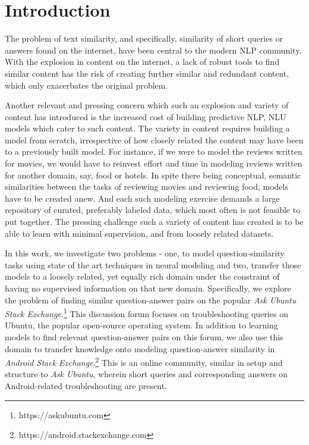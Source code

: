 \documentclass{sigkddExp}
\begin{document}
\section{Introduction}
The problem of text similarity, and specifically, similarity of short queries or answers found on the internet, have been central to the modern NLP community. With the explosion in content on the internet, a lack of robust tools to find similar content has the risk of creating further similar and redundant content, which only exacerbates the original problem.

Another relevant and pressing concern which such an explosion and variety of content has introduced is the increased cost of building predictive NLP, NLU models which cater to such content. The variety in content requires building a model from scratch, irrespective of how closely related the content may have been to a previously built model. For instance, if we were to model the reviews written for movies, we would have to reinvest effort and time in modeling reviews written for another domain, say, food or hotels. In spite there being conceptual, semantic similarities between the tasks of reviewing movies and reviewing food, models have to be created anew. And each such modeling exercise demands a large repository of curated, preferably labeled data, which most often is not feasible to put together. The pressing challenge such a variety of content has created is to be able to learn with minimal supervision, and from loosely related datasets.

In this work, we investigate two problems - one, to model question-similarity tasks using state of the art techniques in neural modeling and two, transfer those models to a loosely related, yet equally rich domain under the constraint of having no supervised information on that new domain. Specifically, we explore the problem of finding similar question-answer pairs on the popular \textit{Ask Ubuntu Stack Exchange}.\footnote{https://askubuntu.com} This discussion forum focuses on troubleshooting queries on Ubuntu, the popular open-source operating system. In addition to  learning models to find relevant question-answer pairs on this forum, we also use this domain to transfer knowledge onto modeling question-answer similarity in \textit{Android Stack Exchange}.\footnote{https://android.stackexchange.com} This is an online community, similar in setup and structure to \textit{Ask Ubuntu}, wherein short queries and corresponding answers on Android-related troubleshooting are present.
\end{document}
